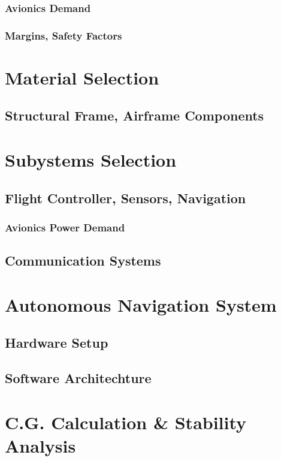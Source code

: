 \documentclass[12pt]{report}
\begin{document}
        \subsubsection{Avionics Demand}
        \subsubsection{Margins, Safety Factors}
    \section{Material Selection}
      \subsection{Structural Frame, Airframe Components}
    

    \section{Subystems Selection}
      \subsection{Flight Controller, Sensors, Navigation}
        \subsubsection{Avionics Power Demand}
      \subsection{Communication Systems}

    \section{Autonomous Navigation System}
      \subsection{Hardware Setup}
      \subsection{Software Architechture}

    \section{C.G. Calculation \& Stability Analysis}
\end{document}
